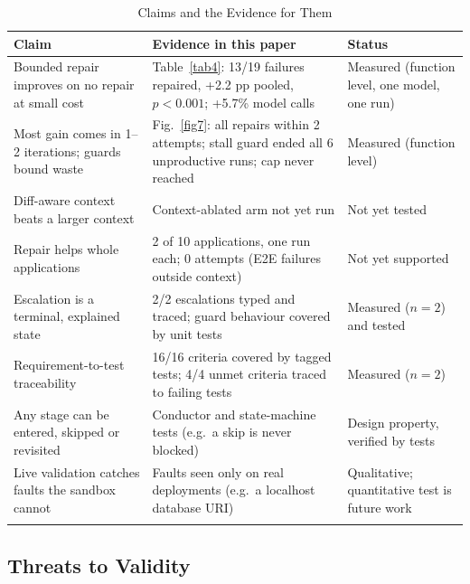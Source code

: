 \documentclass[pdflatex,sn-mathphys-num]{sn-jnl}%
\theoremstyle{thmstyleone}%
\theoremstyle{thmstyletwo}%
\theoremstyle{thmstylethree}%
\begin{document}
\begin{table}[t]
\caption{Claims and the Evidence for Them}\label{tab7}%
\small
\begin{tabular*}{\textwidth}{@{\extracolsep\fill}p{3.3cm}p{5.0cm}p{3.4cm}@{}}
\toprule
\raggedright{}\textbf{Claim} & \raggedright{}\textbf{Evidence in this paper} & \raggedright{}\textbf{Status}\tabularnewline
\midrule
\raggedright{}Bounded repair improves on no repair at small cost & \raggedright{}Table~\ref{tab4}: 13/19 failures repaired, +2.2 pp pooled, $p < 0.001$; +5.7\% model calls & \raggedright{}Measured (function level, one model, one run)\tabularnewline
\raggedright{}Most gain comes in 1--2 iterations; guards bound waste & \raggedright{}Fig.~\ref{fig7}: all repairs within 2 attempts; stall guard ended all 6 unproductive runs; cap never reached & \raggedright{}Measured (function level)\tabularnewline
\raggedright{}Diff-aware context beats a larger context & \raggedright{}Context-ablated arm not yet run & \raggedright{}Not yet tested\tabularnewline
\raggedright{}Repair helps whole applications & \raggedright{}2 of 10 applications, one run each; 0 attempts (E2E failures outside context) & \raggedright{}Not yet supported\tabularnewline
\raggedright{}Escalation is a terminal, explained state & \raggedright{}2/2 escalations typed and traced; guard behaviour covered by unit tests & \raggedright{}Measured ($n = 2$) and tested\tabularnewline
\raggedright{}Requirement-to-test traceability & \raggedright{}16/16 criteria covered by tagged tests; 4/4 unmet criteria traced to failing tests & \raggedright{}Measured ($n = 2$)\tabularnewline
\raggedright{}Any stage can be entered, skipped or revisited & \raggedright{}Conductor and state-machine tests (e.g.\ a skip is never blocked) & \raggedright{}Design property, verified by tests\tabularnewline
\raggedright{}Live validation catches faults the sandbox cannot & \raggedright{}Faults seen only on real deployments (e.g.\ a localhost database URI) & \raggedright{}Qualitative; quantitative test is future work\tabularnewline
\botrule
\end{tabular*}
\end{table}

\subsection{Threats to Validity}\label{sec9.3}
\end{document}
